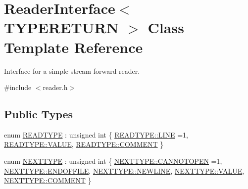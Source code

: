 \hypertarget{classReaderInterface}{}\section{Reader\+Interface$<$ T\+Y\+P\+E\+R\+E\+T\+U\+RN $>$ Class Template Reference}
\label{classReaderInterface}


Interface for a simple stream forward reader.  




{\ttfamily \#include $<$reader.\+h$>$}

\subsection*{Public Types}
\begin{DoxyCompactItemize}
\item 
enum \hyperlink{classReaderInterface_a1e3610c289ae058a246de41154d8a266}{R\+E\+A\+D\+T\+Y\+PE} \+: unsigned int \{ \hyperlink{classReaderInterface_a1e3610c289ae058a246de41154d8a266a17b8ef2c330f1430e00c9de5469fc7e7}{R\+E\+A\+D\+T\+Y\+P\+E\+::\+L\+I\+NE} =1, 
\hyperlink{classReaderInterface_a1e3610c289ae058a246de41154d8a266aecc2e9c313faddb07e7da223c1dc5c3f}{R\+E\+A\+D\+T\+Y\+P\+E\+::\+V\+A\+L\+UE}, 
\hyperlink{classReaderInterface_a1e3610c289ae058a246de41154d8a266af2cd320b55767434dd48d81b165ea956}{R\+E\+A\+D\+T\+Y\+P\+E\+::\+C\+O\+M\+M\+E\+NT}
 \}
\item 
enum \hyperlink{classReaderInterface_ac2420ec8d2f60feadf2533d4fa77ec5e}{N\+E\+X\+T\+T\+Y\+PE} \+: unsigned int \{ \newline
\hyperlink{classReaderInterface_ac2420ec8d2f60feadf2533d4fa77ec5ea8ab6f4178d635d263f25ffd1059bf3f8}{N\+E\+X\+T\+T\+Y\+P\+E\+::\+C\+A\+N\+N\+O\+T\+O\+P\+EN} =1, 
\hyperlink{classReaderInterface_ac2420ec8d2f60feadf2533d4fa77ec5ea055b05aa58eadd86120b994017873064}{N\+E\+X\+T\+T\+Y\+P\+E\+::\+E\+N\+D\+O\+F\+F\+I\+LE}, 
\hyperlink{classReaderInterface_ac2420ec8d2f60feadf2533d4fa77ec5ea80c8c6b1bcf9ad27b73d5aaa56ed4ff3}{N\+E\+X\+T\+T\+Y\+P\+E\+::\+N\+E\+W\+L\+I\+NE}, 
\hyperlink{classReaderInterface_ac2420ec8d2f60feadf2533d4fa77ec5eaecc2e9c313faddb07e7da223c1dc5c3f}{N\+E\+X\+T\+T\+Y\+P\+E\+::\+V\+A\+L\+UE}, 
\newline
\hyperlink{classReaderInterface_ac2420ec8d2f60feadf2533d4fa77ec5eaf2cd320b55767434dd48d81b165ea956}{N\+E\+X\+T\+T\+Y\+P\+E\+::\+C\+O\+M\+M\+E\+NT}
 \}
\end{DoxyCompactItemize}
